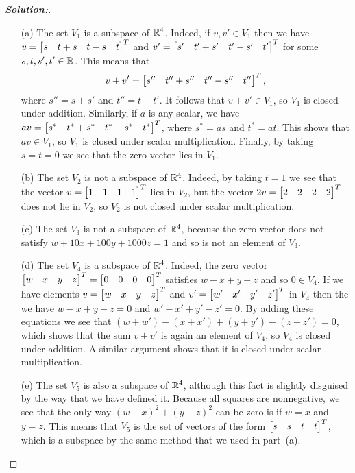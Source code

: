 \documentclass[a4paper]{amsart}
\theoremstyle{definition}
\newenvironment{solution}{\begin{proof}[\textbf{Solution:}] \vphantom{u}}{\end{proof}}
\begin{document}
\begin{solution}
 \begin{itemize}
  \item[(a)] The set $V_1$ is a subspace of ${\mathbb{R}}^4$.  Indeed, if $v,v'\in V_1$
   then we have $v=\left[\begin{matrix} s&t+s&t-s&t\end{matrix}\right]^T$ and $v'=\left[\begin{matrix}
   s'&t'+s'&t'-s'&t'\end{matrix}\right]^T$ for some $s,t,s',t'\in{\mathbb{R}}$.  This means that
   \[
   v+v'=\left[\begin{matrix} s''&t''+s''&t''-s''&t''\end{matrix}\right]^T ,
   \]
   where $s''=s+s'$ and
   $t''=t+t'$.  It follows that $v+v'\in V_1$, so $V_1$ is closed under
   addition.  Similarly, if $a$ is any scalar, we have
   $av=\left[\begin{matrix} s^*&t^*+s^*&t^*-s^*&t^*\end{matrix}\right]^T$, where $s^*=as$ and
   $t^*=at$.  This shows that $av\in V_1$, so $V_1$ is closed under
   scalar multiplication.  Finally, by taking $s=t=0$ we see that the
   zero vector lies in $V_1$.
  \item[(b)] The set $V_2$ is not a subspace of ${\mathbb{R}}^4$.  Indeed, by
   taking $t=1$ we see that the vector $v=\left[\begin{matrix} 1&1&1&1\end{matrix}\right]^T$ lies in
   $V_2$, but the vector $2v=\left[\begin{matrix} 2&2&2&2\end{matrix}\right]^T$ does not lie in
   $V_2$, so $V_2$ is not closed under scalar multiplication.
  \item[(c)] The set $V_3$ is not a subspace of ${\mathbb{R}}^4$, because the
   zero vector does not satisfy $w+10x+100y+1000z=1$ and so is not an
   element of $V_3$.
  \item[(d)] The set $V_4$ is a subspace of ${\mathbb{R}}^4$.  Indeed, the zero
   vector $\left[\begin{matrix} w&x&y&z\end{matrix}\right]^T=\left[\begin{matrix} 0&0&0&0\end{matrix}\right]^T$ satisfies $w-x+y-z$
   and so $0\in V_4$.  If we have elements $v=\left[\begin{matrix} w&x&y&z\end{matrix}\right]^T$ and
   $v'=\left[\begin{matrix} w'&x'&y'&z'\end{matrix}\right]^T$ in $V_4$ then the we have $w-x+y-z=0$
   and $w'-x'+y'-z'=0$.  By adding these equations we see that
   $(w+w')-(x+x')+(y+y')-(z+z')=0$, which shows that the sum $v+v'$ is
   again an element of $V_4$, so $V_4$ is closed under addition.  A
   similar argument shows that it is closed under scalar
   multiplication.
  \item[(e)] The set $V_5$ is also a subspace of ${\mathbb{R}}^4$, although this
   fact is slightly disguised by the way that we have defined it.
   Because all squares are nonnegative, we see that the only way
   $(w-x)^2+(y-z)^2$ can be zero is if $w=x$ and $y=z$.  This means
   that $V_5$ is the set of vectors of the form $\left[\begin{matrix} s&s&t&t\end{matrix}\right]^T$,
   which is a subspace by the same method that we used in part~(a).
 \end{itemize}
\end{solution}
\end{document}
